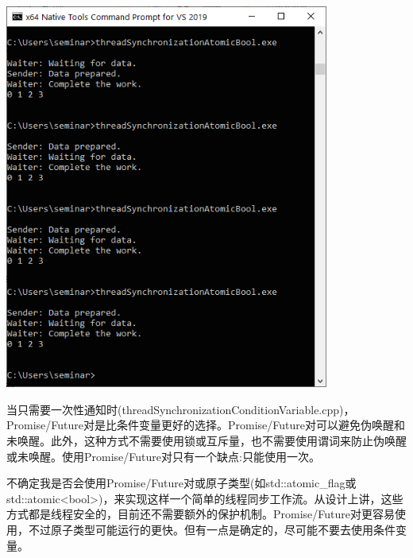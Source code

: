 \begin{center}
\includegraphics[width=0.8\textwidth]{content/3/chapter6/images/14.png}\\
\end{center}

\begin{tcolorbox}[breakable,enhanced jigsaw,colback=blue!5!white,colframe=blue!75!black,title={条件变量、Promise/Future对和std::atomic\_flag}]
	
当只需要一次性通知时(threadSynchronizationConditionVariable.cpp)，Promise/Future对是比条件变量更好的选择。Promise/Future对可以避免伪唤醒和未唤醒。此外，这种方式不需要使用锁或互斥量，也不需要使用谓词来防止伪唤醒或未唤醒。使用Promise/Future对只有一个缺点:只能使用一次。


不确定我是否会使用Promise/Future对或原子类型(如std::atomic\_flag或std::atomic<bool>)，来实现这样一个简单的线程同步工作流。从设计上讲，这些方式都是线程安全的，目前还不需要额外的保护机制。Promise/Future对更容易使用，不过原子类型可能运行的更快。但有一点是确定的，尽可能不要去使用条件变量。
	
\end{tcolorbox}


